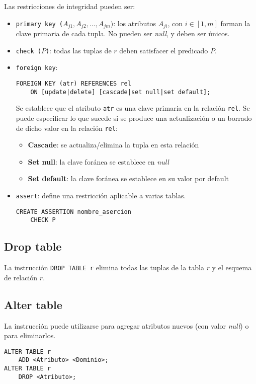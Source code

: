 \documentclass[a4paper, twoside]{article}
\begin{document}
Las restricciones de integridad pueden ser:
\begin{itemize}
	\item \texttt{primary key ($A_{j1},A_{j2},\dots,A_{jm})$}: los atributos $A_{ji}$, con $i\in[1,m]$ forman la clave primaria de cada tupla. No pueden ser \emph{null}, y deben ser únicos.
	\item \texttt{check ($P$)}: todas las tuplas de $r$ deben satisfacer el predicado $P$.
	\item \texttt{foreign key}:
	\begin{lstlisting}
FOREIGN KEY (atr) REFERENCES rel
	ON [update|delete] [cascade|set null|set default];
	\end{lstlisting}

	Se establece que el atributo \texttt{atr} es una clave primaria en la relación \texttt{rel}. Se puede especificar lo que sucede si se produce una actualización o un borrado de dicho valor en la relación \texttt{rel}:
	\begin{itemize}
		\item \textbf{Cascade}: se actualiza/elimina la tupla en esta relación
		\item \textbf{Set null}: la clave foránea se establece en \emph{null}
		\item \textbf{Set default}: la clave foránea se establece en su valor por default
	\end{itemize}
	\item \texttt{assert}: define una restricción aplicable a varias tablas.
	\begin{lstlisting}
CREATE ASSERTION nombre_asercion
	CHECK P
	\end{lstlisting}
\end{itemize}

\subsection{Drop table}
La instrucción \texttt{DROP TABLE r} elimina todas las tuplas de la tabla $r$ y el esquema de relación $r$.

\subsection{Alter table}
La instrucción puede utilizarse para agregar atributos nuevos (con valor \emph{null}) o para eliminarlos.

\begin{lstlisting}
ALTER TABLE r 
	ADD <Atributo> <Dominio>;
ALTER TABLE r 
	DROP <Atributo>;
\end{lstlisting}
\end{document}
